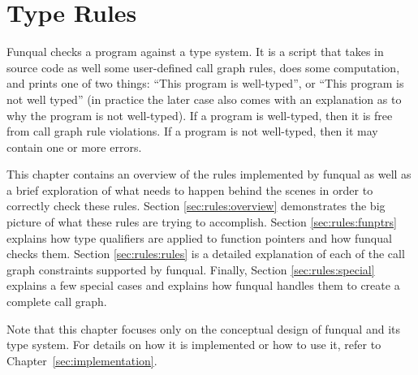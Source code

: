 \chapter{Type Rules}\label{sec:rules}

Funqual checks a program against a type system.  It is a script that takes in source code as well some user-defined call graph rules, does some computation, and prints one of two things: ``This program is well-typed'', or ``This program is not well typed'' (in practice the later case also comes with an explanation as to why the program is not well-typed).  If a program is well-typed, then it is free from call graph rule violations.  If a program is not well-typed, then it may contain one or more errors.

This chapter contains an overview of the rules implemented by funqual as well as a brief exploration of what needs to happen behind the scenes in order to correctly check these rules.  Section \ref{sec:rules:overview} demonstrates the big picture of what these rules are trying to accomplish.  Section \ref{sec:rules:funptrs} explains how type qualifiers are applied to function pointers and how funqual checks them.  Section \ref{sec:rules:rules} is a detailed explanation of each of the call graph constraints supported by funqual.  Finally, Section \ref{sec:rules:special} explains a few special cases and explains how funqual handles them to create a complete call graph.

Note that this chapter focuses only on the conceptual design of funqual and its type system.  For details on how it is implemented or how to use it, refer to \mbox{Chapter \ref{sec:implementation}}.








